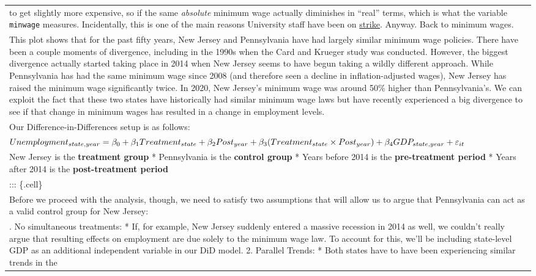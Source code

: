 \documentclass[
  letterpaper,
  DIV=11,
  numbers=noendperiod]{scrreprt}
\begin{document}
\begin{longtable}[]{@{}
  >{\raggedright\arraybackslash}p{}@{}}
to get slightly more expensive, so if the same \emph{absolute} minimum
wage actually diminishes in ``real'' terms, which is what the variable
\texttt{minwage} measures. Incidentally, this is one of the main reasons
University staff have been on
\href{https://www.ucu.org.uk/article/11830/University-staff-pay-cut-by-20-new-figures-show}{strike}.
Anyway. Back to minimum wages. \\
This plot shows that for the past fifty years, New Jersey and
Pennsylvania have had largely similar minimum wage policies. There have
been a couple moments of divergence, including in the 1990s when the
Card and Krueger study was conducted. However, the biggest divergence
actually started taking place in 2014 when New Jersey seems to have
begun taking a wildly different approach. While Pennsylvania has had the
same minimum wage since 2008 (and therefore seen a decline in
inflation-adjusted wages), New Jersey has raised the minimum wage
significantly twice. In 2020, New Jersey's minimum wage was around 50\%
higher than Pennsylvania's. We can exploit the fact that these two
states have historically had similar minimum wage laws but have recently
experienced a big divergence to see if that change in minimum wages has
resulted in a change in employment levels. \\
Our Difference-in-Differences setup is as follows: \\
\(\large Unemployment_{state, year} = \beta_0 + \beta_1 Treatment_{state} + \beta_2 Post_{year} + \beta_3 (Treatment_{state} \times Post_{year}) + \beta_4 GDP_{state,year} + \varepsilon_{it}\) \\
* New Jersey is the \textbf{treatment group} * Pennsylvania is the
\textbf{control group} * Years before 2014 is the \textbf{pre-treatment
period} * Years after 2014 is the \textbf{post-treatment period} \\
::: \{.cell\} \\
Before we proceed with the analysis, though, we need to satisfy two
assumptions that will allow us to argue that Pennsylvania can act as a
valid control group for New Jersey: \\
1. No simultaneous treatments: * If, for example, New Jersey suddenly
entered a massive recession in 2014 as well, we couldn't really argue
that resulting effects on employment are due solely to the minimum wage
law. To account for this, we'll be including state-level GDP as an
additional independent variable in our DiD model. 2. Parallel Trends: *
Both states have to have been experiencing similar trends in the

\end{longtable}
\end{document}
